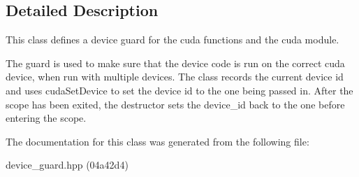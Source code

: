 \subsection{Detailed Description}
This class defines a device guard for the cuda functions and the cuda module. 

The guard is used to make sure that the device code is run on the correct cuda device, when run with multiple devices. The class records the current device id and uses {\ttfamily cuda\+Set\+Device} to set the device id to the one being passed in. After the scope has been exited, the destructor sets the device\+\_\+id back to the one before entering the scope. 

The documentation for this class was generated from the following file\+:\begin{DoxyCompactItemize}
\item 
device\+\_\+guard.\+hpp (04a42d4)\end{DoxyCompactItemize}

